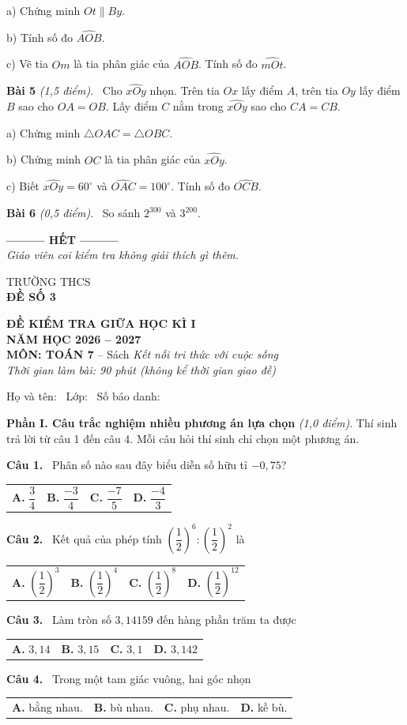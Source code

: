 \documentclass[12pt,a4paper]{article}
\makeatletter
\newcommand{\bonpa}[4]{\par\noindent\begin{tabularx}{\linewidth}{@{\hspace{0.6cm}}XXXX@{}}
\textbf{A.} #1 & \textbf{B.} #2 & \textbf{C.} #3 & \textbf{D.} #4\end{tabularx}\par}
\newcommand{\cau}[1]{\par\medskip\textbf{Câu #1.}~}
\newcommand{\bai}[2]{\par\medskip\textbf{Bài #1} \textit{(#2)}.~}
\newcommand{\y}[1]{\par\hspace*{0.6cm}#1}
\newcommand{\phan}[1]{\par\bigskip{\large\textbf{#1}}\par\smallskip}
\makeatother
\begin{document}
\y{a) Chứng minh $Ot\parallel By$.}
\y{b) Tính số đo $\widehat{AOB}$.}
\y{c) Vẽ tia $Om$ là tia phân giác của $\widehat{AOB}$. Tính số đo $\widehat{mOt}$.}
\bai{5}{1,5 điểm} Cho $\widehat{xOy}$ nhọn. Trên tia $Ox$ lấy điểm $A$, trên tia $Oy$ lấy điểm $B$ sao cho $OA=OB$. Lấy điểm $C$ nằm trong $\widehat{xOy}$ sao cho $CA=CB$.
\y{a) Chứng minh $\triangle OAC=\triangle OBC$.}
\y{b) Chứng minh $OC$ là tia phân giác của $\widehat{xOy}$.}
\y{c) Biết $\widehat{xOy}=60^\circ$ và $\widehat{OAC}=100^\circ$. Tính số đo $\widehat{OCB}$.}
\bai{6}{0,5 điểm} So sánh $2^{300}$ và $3^{200}$.

\bigskip\begin{center}\textbf{--------- HẾT ---------}\\
\textit{Giáo viên coi kiểm tra không giải thích gì thêm.}\end{center}

\newpage
\noindent
\begin{minipage}[t]{0.38\linewidth}\centering
TRƯỜNG THCS \dotfill\\[2pt]
\textbf{ĐỀ SỐ 3}
\end{minipage}\hfill
\begin{minipage}[t]{0.6\linewidth}\centering
\textbf{ĐỀ KIỂM TRA GIỮA HỌC KÌ I}\\
\textbf{NĂM HỌC 2026 -- 2027}\\
\textbf{MÔN: TOÁN 7} -- Sách \textit{Kết nối tri thức với cuộc sống}\\
\textit{Thời gian làm bài: 90 phút (không kể thời gian giao đề)}
\end{minipage}

\medskip
Họ và tên: \dotfill\ Lớp: \makebox[2cm]{\dotfill}\ Số báo danh: \makebox[2.5cm]{\dotfill}
\phan{A. TRẮC NGHIỆM (3,0 điểm)}
\textbf{Phần I. Câu trắc nghiệm nhiều phương án lựa chọn} \textit{(1,0 điểm)}. Thí sinh trả lời từ câu 1 đến câu 4. Mỗi câu hỏi thí sinh chỉ chọn một phương án.
\cau{1} Phân số nào sau đây biểu diễn số hữu tỉ $-0{,}75$?
\bonpa{$\dfrac{3}{4}$}{$\dfrac{-3}{4}$}{$\dfrac{-7}{5}$}{$\dfrac{-4}{3}$}
\cau{2} Kết quả của phép tính $\left(\dfrac{1}{2}\right)^{6}:\left(\dfrac{1}{2}\right)^{2}$ là
\bonpa{$\left(\dfrac{1}{2}\right)^{3}$}{$\left(\dfrac{1}{2}\right)^{4}$}{$\left(\dfrac{1}{2}\right)^{8}$}{$\left(\dfrac{1}{2}\right)^{12}$}
\cau{3} Làm tròn số $3{,}14159$ đến hàng phần trăm ta được
\bonpa{$3{,}14$}{$3{,}15$}{$3{,}1$}{$3{,}142$}
\cau{4} Trong một tam giác vuông, hai góc nhọn
\bonpa{bằng nhau.}{bù nhau.}{phụ nhau.}{kề bù.}
\end{document}
